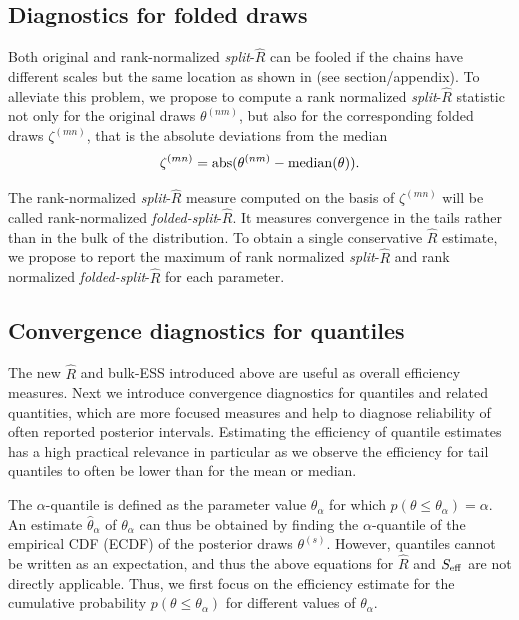 \documentclass[american,]{article}
\begin{document}
\hypertarget{diagnostics-for-folded-draws}{%
\subsection{Diagnostics for folded
draws}\label{diagnostics-for-folded-draws}}

Both original and rank-normalized \emph{split}-\(\widehat{R}\) can be
fooled if the chains have different scales but the same location as
shown in (see section/appendix). To alleviate this problem, we propose to compute a
rank normalized \emph{split}-\(\widehat{R}\) statistic not only for the
original draws \(\theta^{(nm)}\), but also for the corresponding folded
draws \(\zeta^{(mn)}\), that is the absolute deviations from the median
\begin{equation}
\label{zeta}
\zeta^{(mn)} = {\rm abs}(\theta^{(nm)}-{\rm median}(\theta)).
\end{equation}

The rank-normalized \emph{split}-\(\widehat{R}\) measure computed on the
basis of \(\zeta^{(mn)}\) will be called rank-normalized
\emph{folded-split}-\(\widehat{R}\). It measures convergence in the
tails rather than in the bulk of the distribution. To obtain a single
conservative \(\widehat{R}\) estimate, we propose to report the maximum
of rank normalized \emph{split}-\(\widehat{R}\) and rank normalized
\emph{folded-split}-\(\widehat{R}\) for each parameter.

\hypertarget{convergence-diagnostics-for-quantiles}{%
\subsection{Convergence diagnostics for
quantiles}\label{convergence-diagnostics-for-quantiles}}

The new \(\widehat{R}\) and bulk-ESS introduced above are useful as overall efficiency
measures. Next we introduce
convergence diagnostics for quantiles and related quantities, which are more focused measures and help to diagnose reliability of often reported
posterior intervals. Estimating
the efficiency of quantile estimates has a high practical
relevance in particular as we observe the efficiency for tail quantiles
to often be lower than for the mean or median.

The \(\alpha\)-quantile
is defined as the parameter value \(\theta_\alpha\) for which
\(p(\theta \leq \theta_\alpha) = \alpha\). An estimate
\(\hat{\theta}_\alpha\) of \(\theta_\alpha\) can thus be obtained by
finding the \(\alpha\)-quantile of the empirical CDF (ECDF) of the
posterior draws \(\theta^{(s)}\). However, quantiles cannot be written
as an expectation, and thus the above equations for \(\widehat{R}\) and
\(S_{\rm eff}\) are not directly applicable. Thus, we first focus on the
efficiency estimate for the cumulative probability
\(p(\theta \leq \theta_\alpha)\) for different values of
\(\theta_\alpha\).
\end{document}
